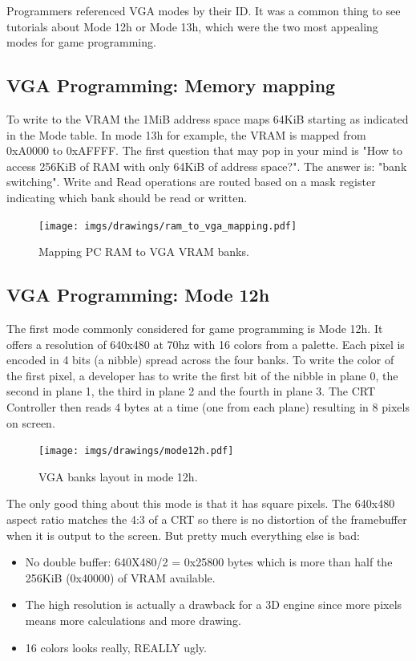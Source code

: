 \documentclass[book.tex]{subfiles}
\begin{document}
 Programmers referenced VGA modes by their ID. It was a common thing to see tutorials about Mode 12h or Mode 13h, which were the two most appealing modes for game programming.


 \subsection{VGA Programming: Memory mapping}
To write to the VRAM the 1MiB address space maps 64KiB starting as indicated in the Mode table. In mode 13h for example, the VRAM is mapped from 0xA0000 to 0xAFFFF. The first question that may pop in your mind is "How to access 256KiB of RAM with only 64KiB of address space?". The answer is: "bank switching". Write and Read operations are routed based on a mask register indicating which bank should be read or written.\\
\par
 \begin{figure}[H]
\centering
  
      \texttt{[image: imgs/drawings/ram\_to\_vga\_mapping.pdf]}
    
\caption{Mapping PC RAM to VGA VRAM banks.}
\end{figure}



 

 \subsection{VGA Programming: Mode 12h}
 The first mode commonly considered for game programming is Mode 12h. It offers a resolution of 640x480 at 70hz with 16 colors from a palette. Each pixel is encoded in 4 bits (a nibble) spread across the four banks. To write the color of the first pixel, a developer has to write the first bit of the nibble in plane 0, the second in plane 1, the third in plane 2 and the fourth in plane 3. The CRT Controller then reads 4 bytes at a time (one from each plane) resulting in 8 pixels on screen.\\
\par
\begin{figure}[H]
\centering
 \texttt{[image: imgs/drawings/mode12h.pdf]}
\caption{VGA banks layout in mode 12h.}
\end{figure}
\par

The only good thing about this mode is that it has square pixels. The 640x480 aspect ratio matches the 4:3 of a CRT so there is no distortion of the framebuffer when it is output to the screen. But pretty much everything else is bad:\\
\begin{itemize}
\item No double buffer: 640X480/2 = 0x25800 bytes which is more than half the 256KiB (0x40000) of VRAM available.
\item The high resolution is actually a drawback for a 3D engine since more pixels means more calculations and more drawing.
\item 16 colors looks really, REALLY ugly.
\end{itemize}
\end{document}
